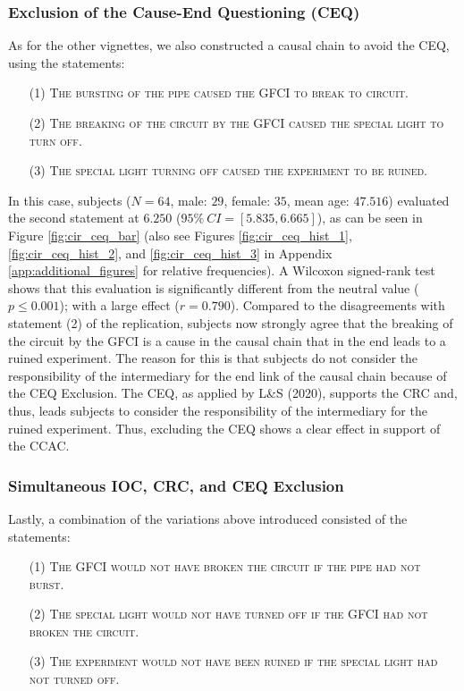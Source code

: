 \documentclass[egregdoesnotlikesansseriftitles,12pt]{scrartcl}
\begin{document}
\subsubsection{Exclusion of the Cause-End Questioning (CEQ)}\label{sec:results_cir_ceq}
As for the other vignettes, we also constructed a causal chain to avoid the CEQ, using the statements:

\begin{itemize}
   \item[(1)]\textsc{The bursting of the pipe caused the GFCI to break to circuit.}
   \item[(2)]\textsc{The breaking of the circuit by the GFCI caused the special light to turn off.}
   \item[(3)]\textsc{The special light turning off caused the experiment to be ruined.}
\end{itemize}

\noindent In this case, subjects ($N=64$, male: $29$, female: $35$, mean age: $47.516$) evaluated the second statement at $6.250$ ($95\%~CI=[5.835,6.665]$), as can be seen in Figure \ref{fig:cir_ceq_bar} (also see Figures \ref{fig:cir_ceq_hist_1}, \ref{fig:cir_ceq_hist_2}, and \ref{fig:cir_ceq_hist_3} in Appendix \ref{app:additional_figures} for relative frequencies). A Wilcoxon signed-rank test shows that this evaluation is significantly different from the neutral value ($p \leq 0.001$); with a large effect ($r=0.790$). Compared to the disagreements with statement (2) of the replication, subjects now strongly agree that the breaking of the circuit by the GFCI is a cause in the causal chain that in the end leads to a ruined experiment. The reason for this is that subjects do not consider the responsibility of the intermediary for the end link of the causal chain because of the CEQ Exclusion. The CEQ, as applied by L\&S (2020), supports the CRC and, thus, leads subjects to consider the responsibility of the intermediary for the ruined experiment. Thus, excluding the CEQ shows a clear effect in support of the CCAC.

\subsubsection{Simultaneous IOC, CRC, and CEQ Exclusion}\label{sec:results_cir_com}
Lastly, a combination of the variations above introduced consisted of the statements:

\begin{itemize}
   \item[(1)]\textsc{The GFCI would not have broken the circuit if the pipe had not burst.}
   \item[(2)]\textsc{The special light would not have turned off if the GFCI had not broken the circuit.}
   \item[(3)]\textsc{The experiment would not have been ruined if the special light had not turned off.}
\end{itemize}
\end{document}
